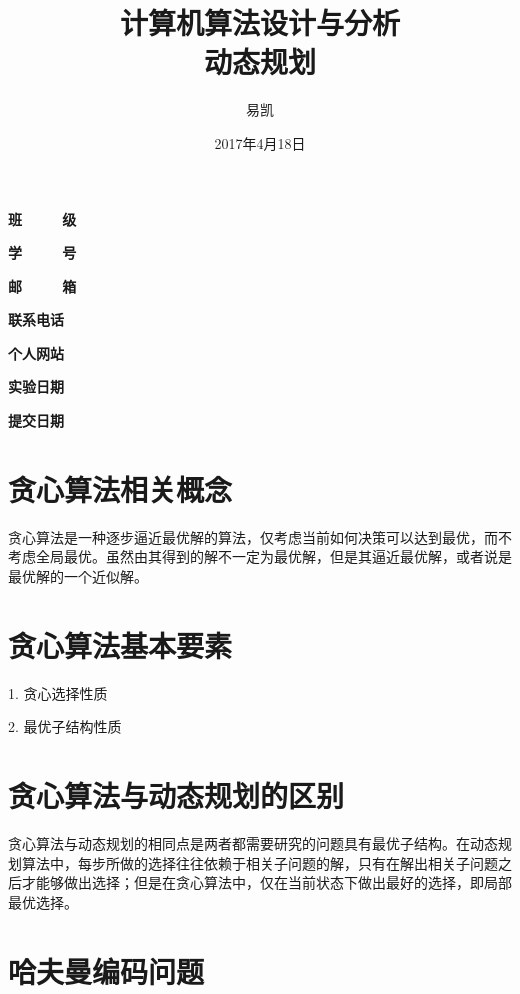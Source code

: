\documentclass[UTF8]{ctexart}
\title{\Huge{计算机算法设计与分析\\ 动态规划}}
\author{\Huge{易凯}}
\date{\Huge{2017年4月18日}}
\begin{document}
    \maketitle
    \vspace{35mm}
    \begin{flushright}
    \Large{
    \textbf{班\ \ \ \ \ 级} 

    \textbf{学\ \ \ \ \ 号} 

    \textbf{邮\ \ \ \ \ 箱} 

    \textbf{联系电话} 

    \textbf{个人网站} 


      \textbf{实验日期} 

    \textbf{提交日期} 
    }
    \end{flushright}

    \newpage
  	\tableofcontents
  	\newpage
  	\listoffigures
    \newpage

    \section{贪心算法相关概念}
    贪心算法是一种逐步逼近最优解的算法，仅考虑当前如何决策可以达到最优，而不考虑全局最优。虽然由其得到的解不一定为最优解，但是其逼近最优解，或者说是最优解的一个近似解。

    \section{贪心算法基本要素}
    1. 贪心选择性质

    2. 最优子结构性质

    \section{贪心算法与动态规划的区别}
    贪心算法与动态规划的相同点是两者都需要研究的问题具有最优子结构。在动态规划算法中，每步所做的选择往往依赖于相关子问题的解，只有在解出相关子问题之后才能够做出选择；但是在贪心算法中，仅在当前状态下做出最好的选择，即局部最优选择。

    \section{哈夫曼编码问题}
\end{document}
